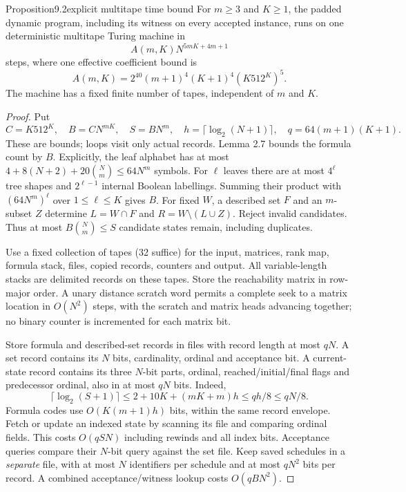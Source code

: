 \begin{numbered}{Proposition}{9.2}{explicit multitape time bound}
For $m\geq3$ and $K\geq1$, the padded dynamic program, including its
witness on every accepted instance, runs on one deterministic multitape
Turing machine in
\[
 A(m,K)N^{5mK+4m+1}\tag{9.1}
\]
steps, where one effective coefficient bound is
\[
 A(m,K)=2^{40}(m+1)^4(K+1)^4(K512^K)^5.
\]
The machine has a fixed finite number of tapes, independent of $m$ and
$K$.
\end{numbered}
\begin{proof}
Put
\[
 C=K512^K,\quad B=CN^{mK},\quad S=BN^m,
 \quad h=\lceil\log_2(N+1)\rceil,\quad q=64(m+1)(K+1).
 \tag{9.2}
\]
These are bounds; loops visit only actual records. Lemma 2.7 bounds the
formula count by $B$. Explicitly, the leaf alphabet has at most
$4+8(N+2)+20\binom Nm\leq64N^m$ symbols. For $\ell$ leaves there
are at most $4^\ell$ tree shapes and $2^{\ell-1}$ internal Boolean
labellings. Summing their product with $(64N^m)^\ell$ over
$1\leq\ell\leq K$ gives $B$.
For fixed $W$, a described set $F$ and an $m$-subset $Z$ determine
$L=W\cap F$ and $R=W\setminus(L\cup Z)$. Reject invalid candidates.
Thus at most $B\binom Nm\leq S$ candidate states remain, including
duplicates.

Use a fixed collection of tapes (32 suffice) for the input, matrices,
rank map, formula stack, files, copied records, counters and output.
All variable-length stacks are delimited records on these tapes.
Store the reachability matrix in row-major order. A unary distance
scratch word permits a complete seek to a matrix location in $O(N^2)$
steps, with the scratch and matrix heads advancing together; no binary
counter is incremented for each matrix bit.

Store formula and described-set records in files with record length at
most $qN$. A set record contains its $N$ bits, cardinality, ordinal and
acceptance bit. A current-state record contains its three $N$-bit parts,
ordinal, reached/initial/final flags and predecessor ordinal, also in
at most $qN$ bits. Indeed,
\[
 \lceil\log_2(S+1)\rceil
 \leq 2+10K+(mK+m)h\leq qh/8\leq qN/8.
\]
Formula codes use $O(K(m+1)h)$ bits, within the same record envelope.
Fetch or update an indexed state by scanning its file and comparing
ordinal fields. This costs $O(qSN)$ including rewinds and all index
bits. Acceptance queries compare their $N$-bit query against the set
file. Keep saved schedules in a \emph{separate} file, with at most $N$
identifiers per schedule and at most $qN^2$ bits per record. A combined
acceptance/witness lookup costs $O(qBN^2)$.


\end{proof}
